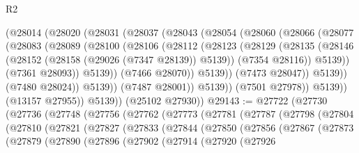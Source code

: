 \begin{lexlean}{R2}
\begin{coremodule}
                  (@28014
                    (@28020
                      (@28031
                        (@28037
                          (@28043
                            (@28054
                              (@28060
                                (@28066
                                  (@28077
                                    (@28083
                                      (@28089
                                        (@28100
                                          (@28106
                                            (@28112
                                              (@28123
                                                (@28129
                                                  (@28135
                                                    (@28146
                                                      (@28152
                                                        (@28158 (@29026 (@7347 @28139)) @5139))
                                                      (@7354 @28116))
                                                    @5139))
                                                (@7361 @28093))
                                              @5139))
                                          (@7466 @28070))
                                        @5139))
                                    (@7473 @28047))
                                  @5139))
                              (@7480 @28024))
                            @5139))
                        (@7487 @28001))
                      @5139))
                  (@7501 @27978))
                @5139))
            (@13157 @27955))
          @5139))
      (@25102 @27930))
@29143 := @27722
    (@27730
      (@27736
        (@27748
          (@27756
            (@27762
              (@27773
                (@27781
                  (@27787
                    (@27798
                      (@27804
                        (@27810
                          (@27821
                            (@27827
                              (@27833
                                (@27844
                                  (@27850
                                    (@27856
                                      (@27867
                                        (@27873
                                          (@27879
                                            (@27890
                                              (@27896
                                                (@27902
                                                  (@27914
                                                    (@27920
                                                      (@27926

\end{coremodule}
\end{lexlean}
